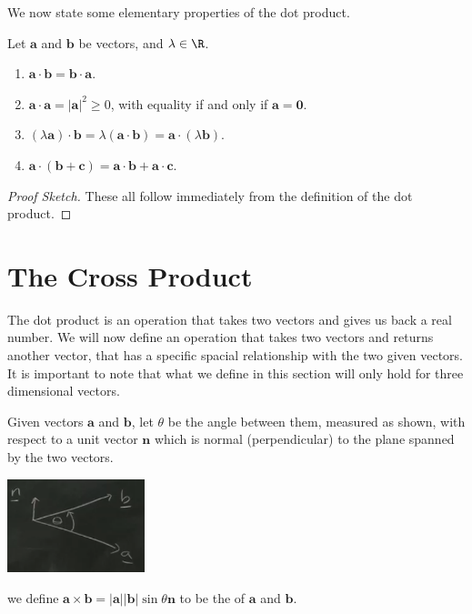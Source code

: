 \documentclass[a4]{scrreprt}
\begin{document}
We now state some elementary properties of the dot product.

\begin{proposition}
	Let $\mathbf{a}$ and $\mathbf{b}$ be vectors, and $\lambda \in \R$.
	\begin{enumerate}[label=(\roman*)]
		\item $\mathbf{a} \cdot \mathbf{b} = \mathbf{b} \cdot \mathbf{a}$.
		\item $\mathbf{a} \cdot \mathbf{a} = |\mathbf{a}|^2 \geq 0$, with equality if and only if $\mathbf{a} = \mathbf{0}$.
		\item $(\lambda \mathbf{a}) \cdot \mathbf{b} = \lambda ( \mathbf{a} \cdot \mathbf{b}) = \mathbf{a} \cdot (\lambda \mathbf{b})$.
		\item $\mathbf{a} \cdot (\mathbf{b} + \mathbf{c}) = \mathbf{a} \cdot \mathbf{b} + \mathbf{a} \cdot \mathbf{c}$.
	\end{enumerate}
\end{proposition}
\begin{proof}[Proof Sketch]
	These all follow immediately from the definition of the dot product.
\end{proof}

\section{The Cross Product}

The dot product is an operation that takes two vectors and gives us back a real number. We will now define an operation that takes two vectors and returns another vector, that has a specific spacial relationship with the two given vectors. It is important to note that what we define in this section will only hold for three dimensional vectors.

\begin{definition}
	Given vectors $\mathbf{a}$ and $\mathbf{b}$, let $\theta$ be the angle between them, measured as shown, with respect to a  unit vector $\mathbf{n}$ which is normal (perpendicular) to the plane spanned by the two vectors.
\begin{center}
	\includegraphics[width=0.3\textwidth]{cross-product-angle.png}
\end{center}
we define $\mathbf{a} \times \mathbf{b} = |\mathbf{a} | |\mathbf{b}| \sin \theta \mathbf{n}$ to be the  of $\mathbf{a}$ and $\mathbf{b}$.
\end{definition}
\end{document}
